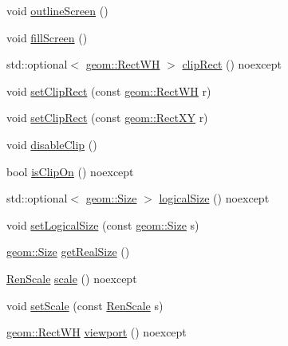 \begin{DoxyCompactItemize}
\item 
void \mbox{\hyperlink{classrolmodl_1_1blend_mode_1_1_ren_ad8897db9e6bd4832e464d0f75098a3df}{outline\+Screen}} ()
\item 
void \mbox{\hyperlink{classrolmodl_1_1blend_mode_1_1_ren_afcb9bfe838d8c32563915e89c8fff6d0}{fill\+Screen}} ()
\item 
std\+::optional$<$ \mbox{\hyperlink{structrolmodl_1_1geom_1_1_rect_w_h}{geom\+::\+Rect\+WH}} $>$ \mbox{\hyperlink{classrolmodl_1_1blend_mode_1_1_ren_a9cf59071d36a429b56fe7a6389ea558b}{clip\+Rect}} () noexcept
\item 
void \mbox{\hyperlink{classrolmodl_1_1blend_mode_1_1_ren_aca0810b89ac60c7044d02ca5c0556018}{set\+Clip\+Rect}} (const \mbox{\hyperlink{structrolmodl_1_1geom_1_1_rect_w_h}{geom\+::\+Rect\+WH}} r)
\item 
void \mbox{\hyperlink{classrolmodl_1_1blend_mode_1_1_ren_a9298eb22c6b88a1e7eadd4a8a9070527}{set\+Clip\+Rect}} (const \mbox{\hyperlink{structrolmodl_1_1geom_1_1_rect_x_y}{geom\+::\+Rect\+XY}} r)
\item 
void \mbox{\hyperlink{classrolmodl_1_1blend_mode_1_1_ren_a866dcc5c50bf59bce17276defb7801af}{disable\+Clip}} ()
\item 
bool \mbox{\hyperlink{classrolmodl_1_1blend_mode_1_1_ren_acdf86b2e5b41aa0501a7ece44ceeed40}{is\+Clip\+On}} () noexcept
\item 
std\+::optional$<$ \mbox{\hyperlink{structrolmodl_1_1geom_1_1_size}{geom\+::\+Size}} $>$ \mbox{\hyperlink{classrolmodl_1_1blend_mode_1_1_ren_a90dbb7a6955076decc470c734fb25ab8}{logical\+Size}} () noexcept
\item 
void \mbox{\hyperlink{classrolmodl_1_1blend_mode_1_1_ren_aacdd424984e4d91836c54284d3429be8}{set\+Logical\+Size}} (const \mbox{\hyperlink{structrolmodl_1_1geom_1_1_size}{geom\+::\+Size}} s)
\item 
\mbox{\hyperlink{structrolmodl_1_1geom_1_1_size}{geom\+::\+Size}} \mbox{\hyperlink{classrolmodl_1_1blend_mode_1_1_ren_aa9471357aaa9b96dabf0050d0335440d}{get\+Real\+Size}} ()
\item 
\mbox{\hyperlink{structrolmodl_1_1blend_mode_1_1_ren_scale}{Ren\+Scale}} \mbox{\hyperlink{classrolmodl_1_1blend_mode_1_1_ren_aa064cf7c4b1e30ff3915afdec061689b}{scale}} () noexcept
\item 
void \mbox{\hyperlink{classrolmodl_1_1blend_mode_1_1_ren_a7a269ad77ed9105327e78c6e7bc1b1c6}{set\+Scale}} (const \mbox{\hyperlink{structrolmodl_1_1blend_mode_1_1_ren_scale}{Ren\+Scale}} s)
\item 
\mbox{\hyperlink{structrolmodl_1_1geom_1_1_rect_w_h}{geom\+::\+Rect\+WH}} \mbox{\hyperlink{classrolmodl_1_1blend_mode_1_1_ren_aad539cdeb1eb935c30c79ec15b1ef312}{viewport}} () noexcept

\end{DoxyCompactItemize}
